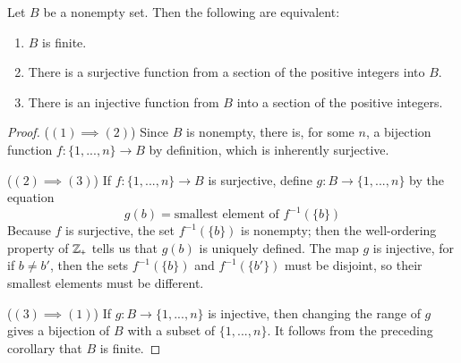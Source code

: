     \begin{corollary}
        Let $B$ be a nonempty set. Then the following are equivalent:\begin{enumerate}
            \item $B$ is finite.
            \item There is a surjective function from a section of the positive integers into $B$.
            \item There is an injective function from $B$ into a section of the positive integers.
        \end{enumerate}
    \end{corollary}
    \begin{proof}
        ($(1)\implies (2)$) Since $B$ is nonempty, there is, for some $n$, a bijection function $f:\{1,...,n\}\rightarrow B$ by definition, which is inherently surjective.

        ($(2)\implies (3)$) If $f:\{1,...,n\}\rightarrow B$ is surjective, define $g:B\rightarrow \{1,...,n\}$ by the equation \begin{equation*}
            g(b) = \text{smallest element of } f^{-1}(\{b\})
        \end{equation*}
        Because $f$ is surjective, the set $f^{-1}(\{b\})$ is nonempty; then the well-ordering property of $\mathbb Z_+$ tells us that $g(b)$ is uniquely defined. The map $g$ is injective, for if $b \neq b'$, then the sets $f^{-1}(\{b\})$ and $f^{-1}(\{b'\})$ must be disjoint, so their smallest elements must be different.


        ($(3)\implies (1)$) If $g:B\rightarrow \{1,...,n\}$ is injective, then changing the range of $g$ gives a bijection of $B$ with a subset of $\{1,...,n\}$. It follows from the preceding corollary that $B$ is finite.
    \end{proof}


